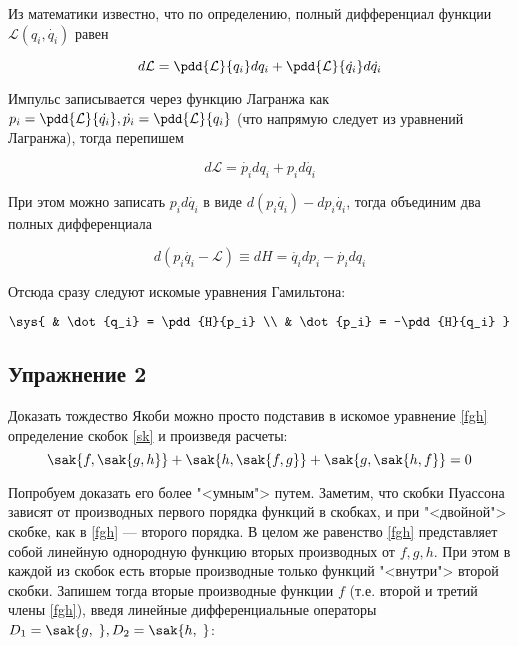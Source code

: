 \documentclass[12pt]{kiarticle}
\newcommand{\Ll}{\ensuremath{\mathcal{L}}}
\begin{document}
	Из математики известно, что по определению, полный дифференциал функции $ \Ll(q_i, \dot{q_i}) $ равен 
	
	\begin{equation}\label{}
	d\Ll = \pdd{\Ll}{q_i}dq_i + \pdd{\Ll}{\dot{q_i}}d\dot{q_i}
	\end{equation}
	
	Импульс записывается через функцию Лагранжа как $ p_i = \pdd{\Ll}{\dot{q_i}}, \dot{p_i} = \pdd{\Ll}{q_i} $ (что напрямую следует из уравнений Лагранжа), тогда перепишем 
	
	\begin{equation}\label{}
	d\Ll = \dot{p_i}dq_i + p_id\dot{q_i}
	\end{equation}
	
	При этом можно записать $ p_id\dot{q_i} $ в виде $ d(p_i\dot{q_i}) -dp_i\dot{q_i} $, тогда объединим два полных дифференциала
	
	\begin{equation}\label{dH}
	d(p_i\dot{q_i} - \Ll) \equiv dH = \dot{q_i}dp_i - \dot{p_i}dq_i
	\end{equation}
	
	Отсюда сразу следуют искомые уравнения Гамильтона:
	
	\begin{equation}\label{HH}
	\sys{
	& \dot{q_i} = \pdd{H}{p_i} \\
	& \dot{p_i} = -\pdd{H}{q_i}
}
	\end{equation}
	
	\subsection{Упражнение 2}
	
	Доказать тождество Якоби можно просто подставив в искомое уравнение \eqref{fgh} определение скобок \eqref{sk} и произведя расчеты: 
	\begin{equation}\label{fgh}
	\sak{f,\sak{g, h}} + \sak{h,\sak{f, g}} + \sak{g,\sak{h, f}} = 0   
	\end{equation}
	
	Попробуем доказать его более "<умным"> путем. Заметим, что скобки Пуассона зависят от производных первого порядка функций в скобках, и при "<двойной"> скобке, как в \eqref{fgh} --- второго порядка. В целом же равенство \eqref{fgh} представляет собой линейную однородную функцию вторых производных от $ f,g,h $. При этом в каждой из скобок есть вторые производные только функций "<внутри"> второй скобки. Запишем тогда вторые производные функции $ f $ (т.е. второй и третий члены \eqref{fgh}), введя линейные дифференциальные операторы $ D_1 = \sak {g, \;}, D_2 = \sak{h, \;} $:
	
\end{document}
